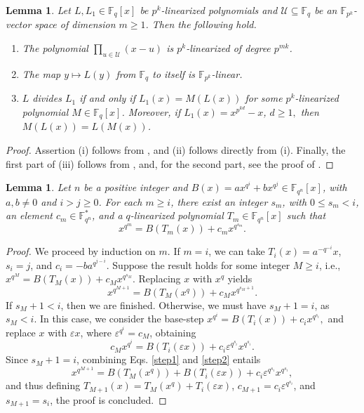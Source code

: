 \documentclass[11pt]{amsart}
\newcommand{\F}{\mathbb{F}}
\newtheorem{lemma}[theorem]{Lemma}
\theoremstyle{definition}
\theoremstyle{remark}
\begin{document}
\begin{lemma}\label{lem:linear}
Let $L, L_1\in \F_{q}[x]$ be $p^k$-linearized polynomials and  $\mathcal U\subseteq \F_q$ be an $\F_{p^k}$-vector space of dimension $m\ge 1$. Then the following hold.

\begin{enumerate}[\rm(i)]
\item The polynomial $\prod_{u\in \mathcal U}(x-u)$ is $p^k$-linearized of degree $p^{mk}$.
\item The map $y\mapsto L(y)$ from $\F_q$ to itself is $\F_{p^k}$-linear.
\item $L$ divides $L_1$ if and only if $L_1(x)=M(L(x))$ for some $p^k$-linearized polynomial $M\in \F_q[x]$. Moreover, if $L_1(x)=x^{p^{kd}}-x$, $d\geq 1,$ then $M(L(x))=L(M(x))$. 
\end{enumerate}
\end{lemma}



\begin{proof}
Assertion  (i) follows  from \cite[Theorem 3.52]{Nie}, and  (ii) follows directly from  (i). 
Finally, the first part of (iii) follows from  \cite[Exercise 3.68]{Nie}, and,  for the second part, see the proof of   \cite[Lemma 3.4]{R21}. 
\end{proof}



\begin{lemma}\label{novo}
Let $n$ be a positive integer and $B(x)=ax^{{q^i}}+bx^{q^{j}}\in \F_{q^n}[x]$, with $a, b\ne 0$ and $i>j\ge 0$. For each $m\ge i$, there exist an integer $s_m$, with $0\le s_m<i$, an element $c_m\in \F_{q^n}^*$, and a $q$-linearized polynomial $T_m\in \F_{q^n}[x]$ such that 
$$x^{q^{m}}=B(T_{m}(x))+c_mx^{q^{s_m}}.$$
\end{lemma}
\begin{proof}
We proceed by induction on $m$. If $m=i$, we can take $T_i(x)=a^{-q^{-i}}x$, $s_i=j$,  and $c_i=-ba^{q^{j-i}}$. Suppose the result holds for some  integer $M \geq i$, i.e., 
$x^{q^{M}}=B(T_{M}(x))+c_Mx^{q^{s_M}}$. Replacing $x$ with $x^q$ yields
\begin{equation}\label{step1}
x^{q^{M+1}}=B(T_{M}(x^q))+c_Mx^{q^{s_M+1}}.
\end{equation}
If $s_M+1<i$,  then we are finished. Otherwise,
we must have  $s_M+1=i$, as  $s_M<i$. In this case, we consider the base-step 
$x^{q^{i}}=B(T_{i}(x))+c_ix^{q^{s_i}},$ and  replace $x$ with $\varepsilon x$,  where  $\varepsilon^{q^i}=c_M$, obtaining 
\begin{equation}\label{step2}
c_Mx^{q^{i}}=B(T_i(\varepsilon x))+c_i\varepsilon^{q^{s_i}}x^{q^{s_i}}.
\end{equation}
Since $s_M+1=i$, combining Eqs. \eqref{step1} and \eqref{step2} entails
$$x^{q^{M+1}}=B(T_{M}(x^q))+B(T_i(\varepsilon x))+c_i\varepsilon^{q^{s_i}}x^{q^{s_i}},$$
and thus  defining  $T_{M+1}(x)=T_M(x^q)+T_i(\varepsilon x)$, $c_{M+1}=c_i\varepsilon^{q^{s_i}}$, and $s_{M+1}=s_i$, the proof is concluded.
\end{proof}
\end{document}
